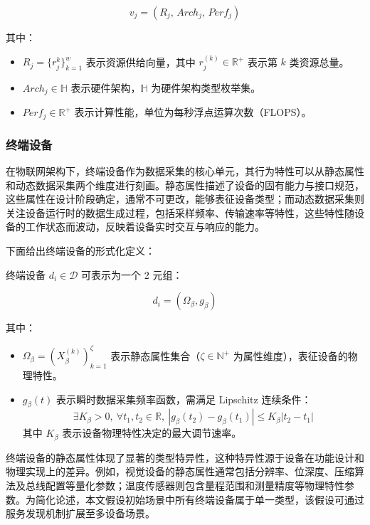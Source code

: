 $$
v_j = (R_j,\, Arch_j,\, Perf_j)
$$

其中：
\begin{itemize}
    \item $R_j = \{r^{k}_j\}_{k=1}^w$ 表示资源供给向量，其中 $r^{(k)}_j \in \mathbb{R}^+$ 表示第 $k$ 类资源总量。
    \item $Arch_j \in \mathbb{H}$ 表示硬件架构，$\mathbb{H}$ 为硬件架构类型枚举集。
    \item $Perf_j \in \mathbb{R}^+$ 表示计算性能，单位为每秒浮点运算次数（FLOPS）。
\end{itemize}

\subsubsection{终端设备}

在物联网架构下，终端设备作为数据采集的核心单元，其行为特性可以从静态属性和动态数据采集两个维度进行刻画。静态属性描述了设备的固有能力与接口规范，这些属性在设计阶段确定，通常不可更改，能够表征设备类型；而动态数据采集则关注设备运行时的数据生成过程，包括采样频率、传输速率等特性，这些特性随设备的工作状态而波动，反映着设备实时交互与响应的能力。

下面给出终端设备的形式化定义：

\begin{definition}[终端设备]
\label{def:device}
终端设备 $d_i \in \mathcal{D}$ 可表示为一个 2 元组：
\end{definition}

$$
d_i = (\Omega_\beta, g_\beta)
$$

其中：
\begin{itemize}
    \item $\Omega_\beta = (X^{(k)}_\beta)_{k=1}^{\zeta}$ 表示静态属性集合（$\zeta \in \mathbb{N}^+$ 为属性维度），表征设备的物理特性。
    \item $g_\beta(t)$ 表示瞬时数据采集频率函数，需满足 Lipschitz 连续条件：
        \begin{equation}
        \exists K_\beta > 0,\ \forall t_1, t_2 \in \mathbb{R},\ |g_\beta(t_2) - g_\beta(t_1)| \leq K_\beta |t_2 - t_1|
        \end{equation}
        其中 $K_\beta$ 表示设备物理特性决定的最大调节速率。
\end{itemize}

终端设备的静态属性体现了显著的类型特异性，这种特异性源于设备在功能设计和物理实现上的差异。例如，视觉设备的静态属性通常包括分辨率、位深度、压缩算法及总线配置等量化参数；温度传感器则包含量程范围和测量精度等物理特性参数。为简化论述，本文假设初始场景中所有终端设备属于单一类型，该假设可通过服务发现机制扩展至多设备场景。

